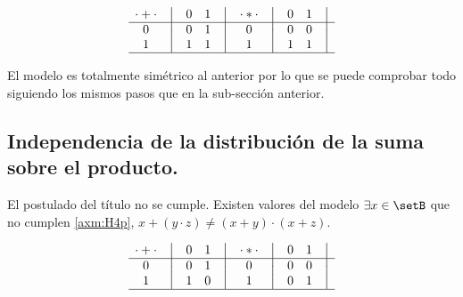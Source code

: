 \begin{equation}
    \begin{matrix}
        {\cdot + \cdot} & \big{\vert} & {0} & {1} & \big{\vert} \\
        \hline
        {0}             & \big{\vert} & {0} & {1} & \big{\vert} \\
        {1}             & \big{\vert} & {1} & {1} & \big{\vert} \\
        \hline
    \end{matrix}
    \quad
    \begin{matrix}
        {\cdot * \cdot} & \big{\vert} & {0} & {1} & \big{\vert} \\
        \hline
        {0}                   & \big{\vert} & {0} & {0} & \big{\vert} \\
        {1}                   & \big{\vert} & {1} & {1} & \big{\vert} \\
        \hline
    \end{matrix}
\end{equation}



	El modelo es totalmente simétrico al anterior por lo que se puede
comprobar todo siguiendo los mismos pasos que en la sub-sección anterior.



\subsection{Independencia de la distribución de la suma sobre el producto.}



	El postulado del título no se cumple. Existen valores del modelo \(
\exists x \in \setB \) que no cumplen \ref{axm:H4p}, \( x + ( y \cdot z )
\neq ( x + y ) \cdot (x + z) \).



\begin{equation}
    \begin{matrix}
        {\cdot + \cdot} & \big{\vert} & {0} & {1} & \big{\vert} \\
        \hline
        {0}             & \big{\vert} & {0} & {1} & \big{\vert} \\
        {1}             & \big{\vert} & {1} & {0} & \big{\vert} \\
        \hline
    \end{matrix}
    \quad
    \begin{matrix}
        {\cdot * \cdot} & \big{\vert} & {0} & {1} & \big{\vert} \\
        \hline
        {0}                   & \big{\vert} & {0} & {0} & \big{\vert} \\
        {1}                   & \big{\vert} & {0} & {1} & \big{\vert} \\
        \hline
    \end{matrix}
\end{equation}



